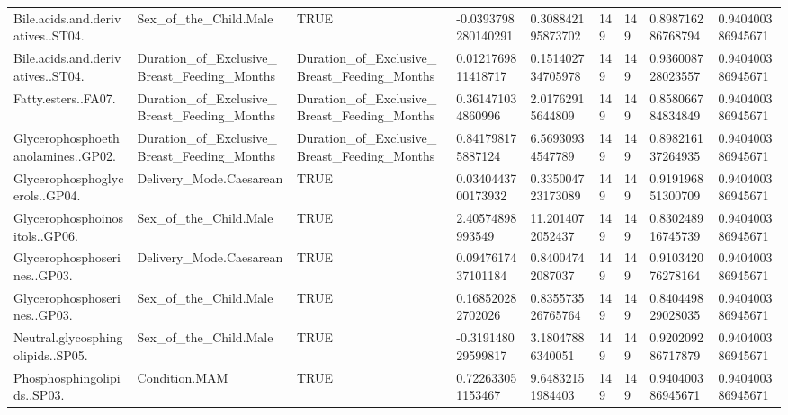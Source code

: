 \begin{longtable}{lllllllll}
Bile.acids.and.derivatives..ST04. & Sex\_of\_the\_Child.Male & TRUE & -0.0393798280140291 & 0.308842195873702 & 149 & 149 & 0.898716286768794 & 0.940400386945671 \\
Bile.acids.and.derivatives..ST04. & Duration\_of\_Exclusive\_Breast\_Feeding\_Months & Duration\_of\_Exclusive\_Breast\_Feeding\_Months & 0.0121769811418717 & 0.151402734705978 & 149 & 149 & 0.936008728023557 & 0.940400386945671 \\
Fatty.esters..FA07. & Duration\_of\_Exclusive\_Breast\_Feeding\_Months & Duration\_of\_Exclusive\_Breast\_Feeding\_Months & 0.361471034860996 & 2.01762915644809 & 149 & 149 & 0.858066784834849 & 0.940400386945671 \\
Glycerophosphoethanolamines..GP02. & Duration\_of\_Exclusive\_Breast\_Feeding\_Months & Duration\_of\_Exclusive\_Breast\_Feeding\_Months & 0.841798175887124 & 6.56930934547789 & 149 & 149 & 0.898216137264935 & 0.940400386945671 \\
Glycerophosphoglycerols..GP04. & Delivery\_Mode.Caesarean & TRUE & 0.0340443700173932 & 0.335004723173089 & 149 & 149 & 0.919196851300709 & 0.940400386945671 \\
Glycerophosphoinositols..GP06. & Sex\_of\_the\_Child.Male & TRUE & 2.40574898993549 & 11.2014072052437 & 149 & 149 & 0.830248916745739 & 0.940400386945671 \\
Glycerophosphoserines..GP03. & Delivery\_Mode.Caesarean & TRUE & 0.0947617437101184 & 0.84004742087037 & 149 & 149 & 0.910342076278164 & 0.940400386945671 \\
Glycerophosphoserines..GP03. & Sex\_of\_the\_Child.Male & TRUE & 0.168520282702026 & 0.835573526765764 & 149 & 149 & 0.840449829028035 & 0.940400386945671 \\
Neutral.glycosphingolipids..SP05. & Sex\_of\_the\_Child.Male & TRUE & -0.319148029599817 & 3.18047886340051 & 149 & 149 & 0.920209286717879 & 0.940400386945671 \\
Phosphosphingolipids..SP03. & Condition.MAM & TRUE & 0.722633051153467 & 9.64832151984403 & 149 & 149 & 0.940400386945671 & 0.940400386945671 \\
\end{longtable}

